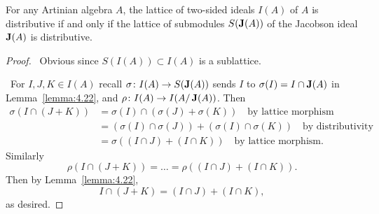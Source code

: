 \begin{proposition}\label{prop:4.23}
For any Artinian algebra $A$, the lattice of two-sided ideals $I(A)$
of $A$ is distributive if and only if the lattice of submodules
$S(\operatorname{\textup{\textbf{J}}}(A))$ of the Jacobson ideal $\operatorname{\textup{\textbf{J}}}(A)$ is distributive.
\end{proposition}

\begin{proof}
\forwardproof\ Obvious since $S(I(A))\subset I(A)$ is a sublattice.

\backwardproof\ For $I,J,K\in I(A)$ recall $\sigma\colon I(A)\to S(\operatorname{\textup{\textbf{J}}}(A))$
sends $I$ to $\sigma(I)=I\cap\operatorname{\textup{\textbf{J}}}(A)$ in Lemma~\ref{lemma:4.22},
and $\rho\colon I(A)\to I(A/\operatorname{\textup{\textbf{J}}}(A))$. Then
\begin{subequations}
  \begin{align}
\sigma(I\cap(J+K))
&=\sigma(I)\cap(\sigma(J)+\sigma(K))\quad\mbox{by lattice morphism}\\
&=(\sigma(I)\cap\sigma(J))+(\sigma(I)\cap\sigma(K))\quad\mbox{by distributivity}\\
&=\sigma((I\cap J)+(I\cap K))\quad\mbox{by lattice morphism.}
  \end{align}
\end{subequations}
Similarly
\begin{equation}
\rho(I\cap(J+K))=\dots=\rho((I\cap J)+(I\cap K)).
\end{equation}
Then by Lemma~\ref{lemma:4.22},
\begin{equation}
I\cap(J+K)=(I\cap J)+(I\cap K),
\end{equation}
as desired.
\end{proof}
